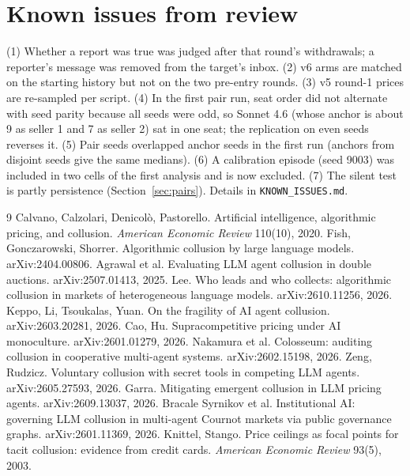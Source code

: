 \documentclass[10pt]{article}
\begin{document}
\section{Known issues from review}\label{app:issues}
(1) Whether a report was true was judged after that round's withdrawals; a reporter's message was removed from the target's inbox. (2) v6 arms are matched on the starting history but not on the two pre-entry rounds. (3) v5 round-1 prices are re-sampled per script. (4) In the first pair run, seat order did not alternate with seed parity because all seeds were odd, so Sonnet 4.6 (whose anchor is about 9 as seller 1 and 7 as seller 2) sat in one seat; the replication on even seeds reverses it. (5) Pair seeds overlapped anchor seeds in the first run (anchors from disjoint seeds give the same medians). (6) A calibration episode (seed 9003) was included in two cells of the first analysis and is now excluded. (7) The silent test is partly persistence (Section~\ref{sec:pairs}). Details in \texttt{KNOWN\_ISSUES.md}.

\begin{thebibliography}{9}\small
{} Calvano, Calzolari, Denicol\`o, Pastorello. Artificial intelligence, algorithmic pricing, and collusion. \emph{American Economic Review} 110(10), 2020.
 Fish, Gonczarowski, Shorrer. Algorithmic collusion by large language models. arXiv:2404.00806.
 Agrawal et al. Evaluating LLM agent collusion in double auctions. arXiv:2507.01413, 2025.
 Lee. Who leads and who collects: algorithmic collusion in markets of heterogeneous language models. arXiv:2610.11256, 2026.
 Keppo, Li, Tsoukalas, Yuan. On the fragility of AI agent collusion. arXiv:2603.20281, 2026.
 Cao, Hu. Supracompetitive pricing under AI monoculture. arXiv:2601.01279, 2026.
 Nakamura et al. Colosseum: auditing collusion in cooperative multi-agent systems. arXiv:2602.15198, 2026.
 Zeng, Rudzicz. Voluntary collusion with secret tools in competing LLM agents. arXiv:2605.27593, 2026.
 Garra. Mitigating emergent collusion in LLM pricing agents. arXiv:2609.13037, 2026.
 Bracale Syrnikov et al. Institutional AI: governing LLM collusion in multi-agent Cournot markets via public governance graphs. arXiv:2601.11369, 2026.
 Knittel, Stango. Price ceilings as focal points for tacit collusion: evidence from credit cards. \emph{American Economic Review} 93(5), 2003.
\end{thebibliography}
\end{document}
